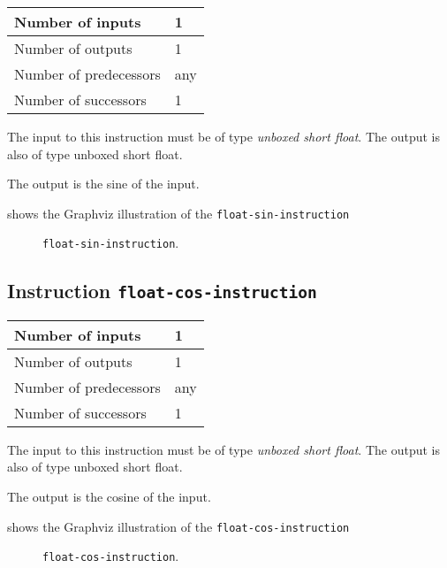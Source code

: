 \begin{tabular}{|l|l|}
\hline
Number of inputs & 1\\
\hline
Number of outputs & 1\\
\hline
Number of predecessors & any\\
\hline
Number of successors & 1\\
\hline
\end{tabular}

The input to this instruction must be of type \emph{unboxed short
  float}. The output is also of type unboxed short float.

The output is the sine of the input.

 shows the Graphviz illustration of the
\texttt{float-sin-instruction}

\begin{figure}
\begin{center}
\end{center}
\caption{\label{fig-float-sin-instruction}
\texttt{float-sin-instruction}.}
\end{figure}

\subsection{Instruction \texttt{float-cos-instruction}}
\label{mir-instruction-float-div}

\begin{tabular}{|l|l|}
\hline
Number of inputs & 1\\
\hline
Number of outputs & 1\\
\hline
Number of predecessors & any\\
\hline
Number of successors & 1\\
\hline
\end{tabular}

The input to this instruction must be of type \emph{unboxed short
  float}. The output is also of type unboxed short float.

The output is the cosine of the input.

 shows the Graphviz illustration of the
\texttt{float-cos-instruction}

\begin{figure}
\begin{center}
\end{center}
\caption{\label{fig-float-cos-instruction}
\texttt{float-cos-instruction}.}
\end{figure}

